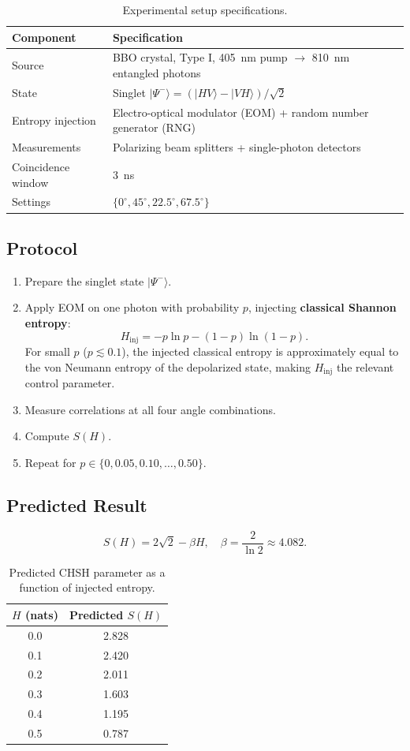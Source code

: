 \documentclass[a4paper]{quantumarticle}
\begin{document}
\begin{table}[H]
\centering
\begin{tabular}{ll}
\toprule
Component & Specification \\
\midrule
Source & BBO crystal, Type I, 405~nm pump $\rightarrow$ 810~nm entangled photons \\
State & Singlet $|\Psi^-\rangle = (|HV\rangle - |VH\rangle)/\sqrt{2}$ \\
Entropy injection & Electro-optical modulator (EOM) + random number generator (RNG) \\
Measurements & Polarizing beam splitters + single-photon detectors \\
Coincidence window & 3~ns \\
Settings & $\{0^\circ, 45^\circ, 22.5^\circ, 67.5^\circ\}$ \\
\bottomrule
\end{tabular}
\caption{Experimental setup specifications.}
\label{tab:setup}
\end{table}

\subsection{Protocol}

\begin{enumerate}
\item Prepare the singlet state $|\Psi^-\rangle$.
\item Apply EOM on one photon with probability $p$, injecting \textbf{classical Shannon entropy}:
\[
H_{\text{inj}} = -p \ln p - (1-p) \ln(1-p).
\]
For small $p$ ($p \lesssim 0.1$), the injected classical entropy is approximately equal to the von Neumann entropy of the depolarized state, making $H_{\text{inj}}$ the relevant control parameter.
\item Measure correlations at all four angle combinations.
\item Compute $S(H)$.
\item Repeat for $p \in \{0, 0.05, 0.10, \dots, 0.50\}$.
\end{enumerate}

\subsection{Predicted Result}

\[
S(H) = 2\sqrt{2} - \beta H, \quad \beta = \frac{2}{\ln 2} \approx 4.082.
\]

\begin{table}[H]
\centering
\begin{tabular}{cc}
\toprule
$H$ (nats) & Predicted $S(H)$ \\
\midrule
0.0 & 2.828 \\
0.1 & 2.420 \\
0.2 & 2.011 \\
0.3 & 1.603 \\
0.4 & 1.195 \\
0.5 & 0.787 \\
\bottomrule
\end{tabular}
\caption{Predicted CHSH parameter as a function of injected entropy.}
\label{tab:prediction}
\end{table}
\end{document}
